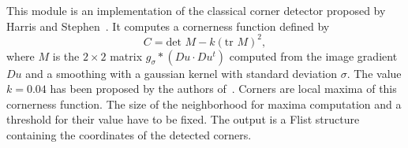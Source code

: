 This module is an implementation of the classical corner detector proposed by
Harris and Stephen~\cite{harris.stephens:combined}. 
It computes a cornerness function defined by $$C=\mbox{det }M-k(\mbox{tr }M)^2,$$
where $M$ is the $2\times 2$ matrix $g_\sigma*(Du\cdot Du ^t)$ computed from
the image gradient $Du$ and a smoothing with a gaussian kernel with standard
deviation $\sigma$. 
The value $k=0.04$ has been proposed by the authors of~\cite{harris.stephens:combined}.
Corners are local maxima of this cornerness function. The
size of the neighborhood for maxima computation and a threshold for their value
have to be fixed.
The output is a Flist structure containing the coordinates of the detected
corners.   

